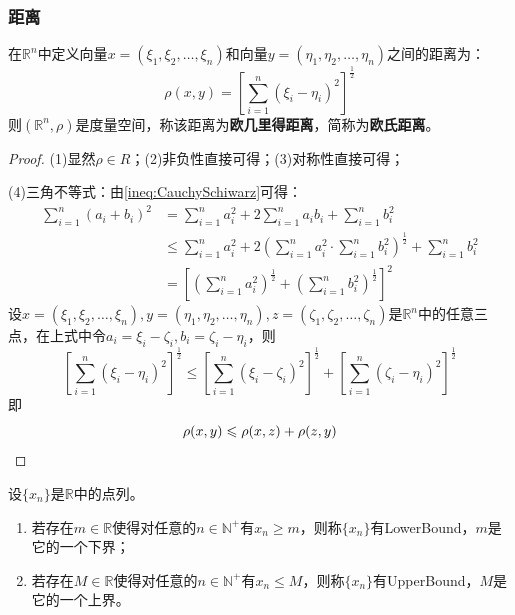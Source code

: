 \subsubsection{距离}
\begin{definition}
	在$\mathbb{R}^{n}$中定义向量$x=(\xi_1,\xi_2,\dots,\xi_n)$和向量$y=(\eta_1,\eta_2,\dots,\eta_n)$之间的距离为：
	\begin{equation*}
		\rho(x,y)=\left[\sum_{i=1}^n(\xi_i-\eta_i)^2\right]^{\frac{1}{2}}
	\end{equation*}
	则$(\mathbb{R}^{n},\rho)$是度量空间，称该距离为\textbf{欧几里得距离}，简称为\textbf{欧氏距离}。
\end{definition}
\begin{proof}
	(1)显然$\rho\in R$；(2)非负性直接可得；(3)对称性直接可得；\par
	(4)三角不等式：由\cref{ineq:CauchySchiwarz}可得：
	\begin{align*}
		\sum_{i=1}^n(a_i+b_i)^2&=\sum_{i=1}^na_i^2+2\sum_{i=1}^na_ib_i+\sum_{i=1}^nb_i^2 \\
		&\leqslant\sum_{i=1}^na_i^2+2\left(\sum_{i=1}^na_i^2\cdot\sum_{i=1}^nb_i^2\right)^{\frac{1}{2}}+\sum_{i=1}^nb_i^2 \\
		&=\left[\left(\sum_{i=1}^na_i^2\right)^{\frac{1}{2}}+\left(\sum_{i=1}^nb_i^2\right)^{\frac{1}{2}}\right]^2
	\end{align*}
	设$x=(\xi_1,\xi_2,\dots,\xi_n),y=(\eta_1,\eta_2,\dots,\eta_n),z=(\zeta_1,\zeta_2,\dots,\zeta_n)$是$\mathbb{R}^{n}$中的任意三点，在上式中令$a_i=\xi_i-\zeta_i,b_i=\zeta_i-\eta_i$，则
	\begin{equation*}
		\left[\sum_{i=1}^n(\xi_i-\eta_i)^2\right]^{\frac{1}{2}}\leqslant	\left[\sum_{i=1}^n(\xi_i-\zeta_i)^2\right]^{\frac{1}{2}}+\left[\sum_{i=1}^n(\zeta_i-\eta_i)^2\right]^{\frac{1}{2}}
	\end{equation*}
	即
	\begin{equation*}
		\rho(x,y)\leqslant\rho(x,z)+\rho(z,y)\qedhere
	\end{equation*}
\end{proof}
\begin{definition}
	设$\{x_n\}$是$\mathbb{R}$中的点列。
	\begin{enumerate}
		\item 若存在$m\in\mathbb{R}$使得对任意的$n\in\mathbb{N}^+$有$x_n\geqslant m$，则称$\{x_n\}$有\gls{LowerBound}，$m$是它的一个下界；
		\item 若存在$M\in\mathbb{R}$使得对任意的$n\in\mathbb{N}^+$有$x_n\leqslant M$，则称$\{x_n\}$有\gls{UpperBound}，$M$是它的一个上界。
	\end{enumerate}
\end{definition}
